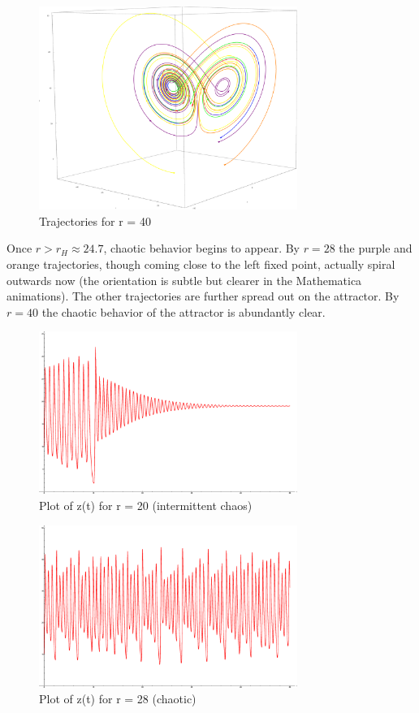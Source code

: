 \documentclass{report}
\begin{document}
\begin{figure}[ht]
  \centering
  \includegraphics[width=0.75\textwidth]{r40.eps}
  \caption{Trajectories for r = 40}
  \label{fig:r_40}
\end{figure}

Once \(r > r_H \approx 24.7 \), chaotic behavior begins to appear. By \(r = 28\)
the purple and orange trajectories, though coming close to the left fixed
point, actually spiral outwards now (the orientation is subtle but clearer
in the Mathematica animations). The other trajectories are further spread
out on the attractor. By \(r = 40\) the chaotic behavior of the attractor is
abundantly clear.


\begin{figure}[ht]
  \centering
  \includegraphics[width=0.75\textwidth]{z-r20.eps}
  \caption{Plot of z(t) for r = 20 (intermittent chaos)}
  \label{fig:z-r20}
\end{figure}

\begin{figure}[ht]
  \centering
  \includegraphics[width=0.75\textwidth]{z-r28.eps}
  \caption{Plot of z(t) for r = 28 (chaotic)}
  \label{fig:z-r28}
\end{figure}
\end{document}
